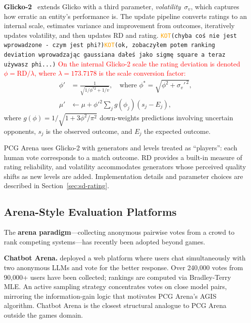 \documentclass[shortabstract, mgr, english]{iithesis}
\newcommand{\DEBUG}[1]{{#1}} %
\newcommand{\KOT}[1]{\DEBUG{\tt{\textcolor{orange}{KOT}(}{#1}{)}}}
\newcommand{\changed}[1]{\textcolor{red}{#1}}
\begin{document}
\textbf{Glicko-2}~\citep{glickman2012glicko2} extends Glicko with a third
parameter, \emph{volatility}~$\sigma_v$, which captures how erratic an entity's
performance is. The update pipeline converts ratings to an internal scale,
estimates variance and improvement from outcomes, iteratively updates volatility,
and then updates RD and rating. \KOT{chyba coś nie jest wprowadzone - czym jest phi?}\KOT{ok, zobaczyłem potem ranking deviation wprowadzając gaussiana dałeś jako sigmę square a teraz używasz phi...} \changed{On the internal Glicko-2 scale the rating
deviation is denoted $\phi = \text{RD} / \lambda$, where
$\lambda = 173.7178$ is the scale conversion factor:}
%
\begin{align}
\phi' &= \frac{1}{\sqrt{1/\phi^{*2} + 1/v}}, \quad
  \text{where } \phi^* = \sqrt{\phi^2 + \sigma_v'^{\,2}},
  \label{eq:glicko-rd-bg} \\
\mu' &\leftarrow \mu + \phi'^2 \sum_j g(\phi_j)(s_j - E_j),
  \label{eq:glicko-mu-bg}
\end{align}
%
where $g(\phi) = 1/\sqrt{1 + 3\phi^2/\pi^2}$ down-weights predictions
involving uncertain opponents, $s_j$ is the observed outcome, and $E_j$ the
expected outcome.

PCG Arena uses Glicko-2 with generators and levels treated as ``players'': each
human vote corresponds to a match outcome. RD provides a built-in measure of
rating reliability, and volatility accommodates generators whose perceived
quality shifts as new levels are added. Implementation details and parameter
choices are described in Section~\ref{sec:sd-rating}.

\subsection{Arena-Style Evaluation Platforms}
\label{subsec:bg-arenas}

The \textbf{arena paradigm}---collecting anonymous pairwise votes from a crowd
to rank competing systems---has recently been adopted beyond games.

\textbf{Chatbot Arena.} \citet{chiang2024chatbot} deployed a web platform where
users chat simultaneously with two anonymous LLMs and vote for the better
response. Over 240,000 votes from 90,000+ users have been collected; rankings are
computed via Bradley-Terry MLE. An active sampling strategy concentrates votes on
close model pairs, mirroring the information-gain logic that motivates PCG
Arena's AGIS algorithm. Chatbot Arena is the closest structural analogue to PCG
Arena outside the games domain.
\end{document}
